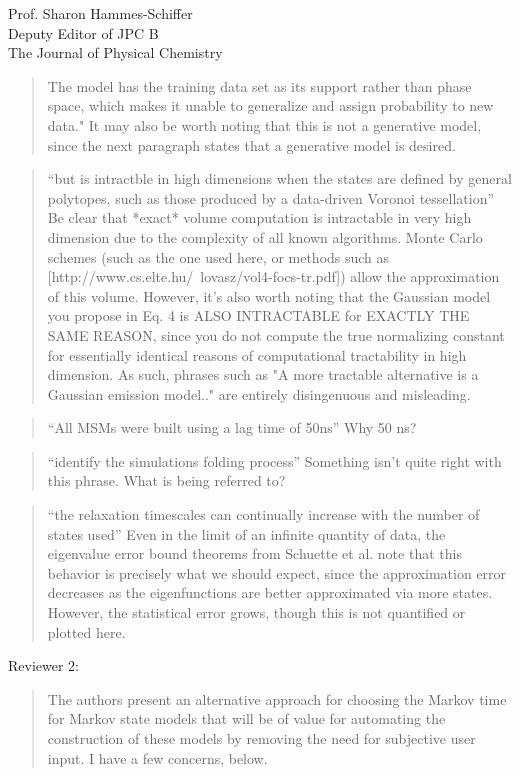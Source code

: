 \documentclass{letter}
\begin{document}
\begin{letter}{Prof. Sharon Hammes-Schiffer \\ Deputy Editor of JPC B \\ The Journal of Physical Chemistry}
\begin{quote}
The model has the training data set as its support rather than phase space, which makes it unable to generalize and assign probability to new data."  It may also be worth noting that this is not a generative model, since the next paragraph states that a generative model is desired.
\end{quote}

\begin{quote}
``but is intractble in high dimensions when the states are defined by general polytopes, such as those produced by a data-driven Voronoi tessellation''  Be clear that *exact* volume computation is intractable in very high dimension due to the complexity of all known algorithms.  Monte Carlo schemes (such as the one used here, or methods such as [http://www.cs.elte.hu/~lovasz/vol4-focs-tr.pdf]) allow the approximation of this volume.  However, it's also worth noting that the Gaussian model you propose in Eq. 4 is ALSO INTRACTABLE for EXACTLY THE SAME REASON, since you do not compute the true normalizing constant for essentially identical reasons of computational tractability in high dimension.  As such, phrases such as "A more tractable alternative is a Gaussian emission model.." are entirely disingenuous and misleading.
\end{quote}

\begin{quote}
``All MSMs were built using a lag time of 50ns''  Why 50 ns?
\end{quote}

\begin{quote}
``identify the simulations folding process''  Something isn't quite right with this phrase.  What is being referred to?
\end{quote}

\begin{quote}
``the relaxation timescales can continually increase with the number of states used''  Even in the limit of an infinite quantity of data, the eigenvalue error bound theorems from Schuette et al. note that this behavior is precisely what we should expect, since the approximation error decreases as the eigenfunctions are better approximated via more states.  However, the statistical error grows, though this is not quantified or plotted here.
\end{quote}

Reviewer 2:

\begin{quote}
The authors present an alternative approach for choosing the Markov time for Markov state models that will be of value for automating the construction of these models by removing the need for subjective user input.  I have a few concerns, below.
\end{quote}


\end{letter}
\end{document}
